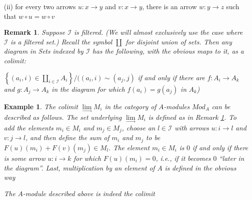 \documentclass{article}
\newtheorem{example}[theorem]{Example}
\newtheorem{remark}[theorem]{Remark}
\begin{document}
(ii) for every two arrows $u: x \rightarrow y$ and $v: x \rightarrow y$, there is an arrow $w: y \rightarrow z$
such that $w \circ u = w \circ v$
\begin{remark}
    Suppose $\mathscr I$ is filtered. (We will almost exclusively use the case where $\mathscr I$ is a filtered set.) Recall the symbol $\coprod$ for disjoint union of sets. Then any diagram in Sets indexed by $\mathscr I$ has the following, with the obvious maps to it, as a colimit:
    \begin{center}
        $\left\{(a_i,i)\in \coprod\limits_{i\in\mathscr I} A_i\right\}
        /
        ((a_i, i) \sim (a_j, j)$ if and only if there are $f : A_i \rightarrow A_k$ and $g: A_j \rightarrow A_k$ in the diagram for which $f(a_i) = g(a_j)$ in $A_k$)
    \end{center}
    \label{1.47}
\end{remark}
\begin{example}
     The colimit $\lim\limits_\rightarrow M_i$ in the category of $A$-modules $Mod_A$ can be described as follows. The set underlying $\lim\limits_\rightarrow M_i$ is defined as in Remark \ref{1.47}. To add the elements $m_i \in M_i$ and $m_j \in M_j$, choose an $l \in\mathscr I$ with arrows $u: i \rightarrow l$ and $v: j \rightarrow l$, and then define the sum of $m_i$ and $m_j$ to be $F(u)(m_i) + F(v)(m_j) \in M_l$. The element $m_i \in M_i$ is $0$ if and only if there is some arrow $u: i \rightarrow k$ for which $F(u)(m_i) = 0$, i.e., if it becomes $0$ “later in the diagram”. Last, multiplication by an element of $A$ is defined in the obvious way

     The $A$-module described above is indeed the colimit
\end{example}
\end{document}
